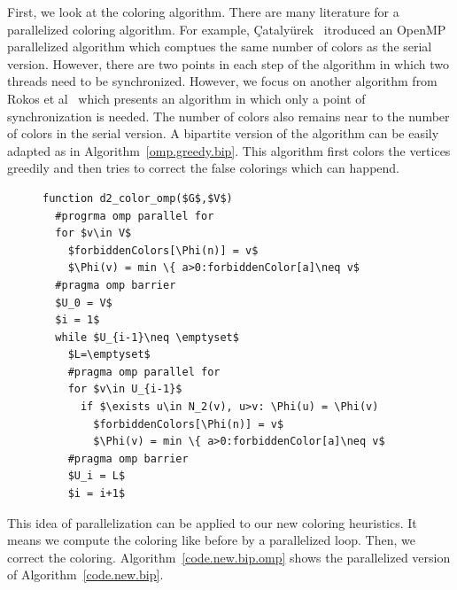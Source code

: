 \documentclass[12pt, oneside]{book}
\newcommand{\coderef}[1]{Algorithm~\protect\ref{#1}}
\begin{document}
First, we look at the coloring algorithm.
There are many literature for a parallelized coloring algorithm.
For example, 
{\c{C}}ataly{\"{u}}rek~\cite{cataly2012} itroduced an OpenMP parallelized
algorithm which comptues the same number of colors as the serial version.
However, there are two points in each step of the algorithm in which two threads
need to be synchronized.
However, we focus on another algorithm from Rokos et al~\cite{Rokos2015} 
which presents an algorithm in which only a point of synchronization is 
needed. The number of colors also remains near to the number of colors
in the serial version. A bipartite version of the algorithm can be easily
adapted as in \coderef{omp.greedy.bip}. This algorithm first colors the vertices
greedily and then tries to correct the false colorings which can happend.
\begin{figure}
\begin{lstlisting}[caption=A OpenMP parallelized version of greedy algorithm
adapted for the bipartite graph.,label=omp.greedy.bip]
function d2_color_omp($G$,$V$)
  #progrma omp parallel for
  for $v\in V$
    $forbiddenColors[\Phi(n)] = v$
    $\Phi(v) = min \{ a>0:forbiddenColor[a]\neq v$
  #pragma omp barrier
  $U_0 = V$
  $i = 1$
  while $U_{i-1}\neq \emptyset$
    $L=\emptyset$
    #pragma omp parallel for
    for $v\in U_{i-1}$
      if $\exists u\in N_2(v), u>v: \Phi(u) = \Phi(v) 
        $forbiddenColors[\Phi(n)] = v$
        $\Phi(v) = min \{ a>0:forbiddenColor[a]\neq v$
    #pragma omp barrier
    $U_i = L$
    $i = i+1$
\end{lstlisting}
\end{figure}
This idea of parallelization can be applied to our new coloring heuristics.
It means we compute the coloring like before by a parallelized loop.
Then, we correct the coloring. \coderef{code.new.bip.omp} shows the parallelized
version of \coderef{code.new.bip}.
\end{document}
